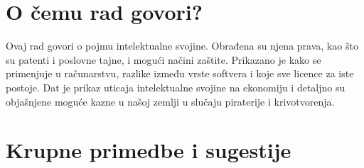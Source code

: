 \documentclass[a4paper]{report}
\begin{document}
\section{O čemu rad govori?}
Ovaj rad govori o pojmu intelektualne svojine. Obrađena su njena prava, kao što su patenti i poslovne tajne, i mogući načini zaštite. Prikazano je kako se primenjuje u računarstvu, razlike između vrste softvera i koje sve licence za iste postoje. Dat je prikaz uticaja intelektualne svojine na ekonomiju i detaljno su objašnjene moguće kazne u našoj zemlji u slučaju piraterije i krivotvorenja. 

\section{Krupne primedbe i sugestije}
\end{document}
